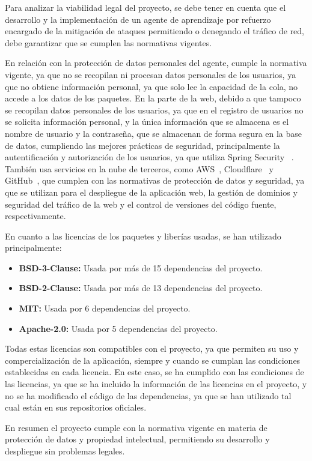 Para analizar la viabilidad legal del proyecto, se debe tener en cuenta que el desarrollo y la implementación de un agente de aprendizaje por refuerzo encargado de la mitigación de ataques permitiendo o denegando el tráfico de red, debe garantizar que se cumplen las normativas vigentes.

En relación con la protección de datos personales del agente, cumple la normativa vigente, ya que no se recopilan ni procesan datos personales de los usuarios, ya que no obtiene información personal, ya que solo lee la capacidad de la cola, no accede a los datos de los paquetes. En la parte de la web, debido a que tampoco se recopilan datos personales de los usuarios, ya que en el registro de usuarios no se solicita información personal, y la única información que se almacena es el nombre de usuario y la contraseña, que se almacenan de forma segura en la base de datos, cumpliendo las mejores prácticas de seguridad, principalmente la autentificación y autorización de los usuarios, ya que utiliza Spring Security ~\cite{SpringSecurity}.
También usa servicios en la nube de terceros, como AWS~\cite{PPAWS}, Cloudflare~\cite{PPCloudflare} y GitHub~\cite{PPGithub}, que cumplen con las normativas de protección de datos y seguridad, ya que se utilizan para el despliegue de la aplicación web, la gestión de dominios y seguridad del tráfico de la web y el control de versiones del código fuente, respectivamente.

En cuanto a las licencias de los paquetes y liberías usadas, se han utilizado principalmente:
\begin{itemize}
    \item \textbf{BSD-3-Clause:} Usada por más de 15 dependencias del proyecto.
    \item \textbf{BSD-2-Clause:} Usada por más de 13 dependencias del proyecto.
    \item \textbf{MIT:} Usada por 6 dependencias del proyecto.
    \item \textbf{Apache-2.0:} Usada por 5 dependencias del proyecto.
\end{itemize}
Todas estas licencias son compatibles con el proyecto, ya que permiten su uso y compercialización de la aplicación, siempre y cuando se cumplan las condiciones establecidas en cada licencia. En este caso, se ha cumplido con las condiciones de las licencias, ya que se ha incluido la información de las licencias en el proyecto, y no se ha modificado el código de las dependencias, ya que se han utilizado tal cual están en sus repositorios oficiales.


En resumen el proyecto cumple con la normativa vigente en materia de protección de datos y propiedad intelectual, permitiendo su desarrollo y despliegue sin problemas legales.